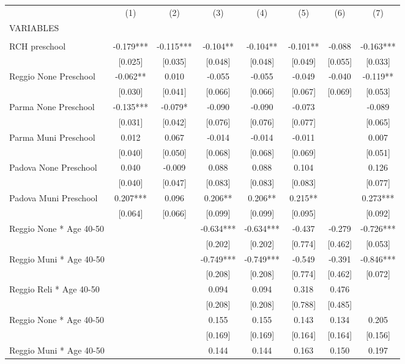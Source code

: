 \begin{tabular}{lccccccc} \hline
 & (1) & (2) & (3) & (4) & (5) & (6) & (7) \\
VARIABLES &  &  &  &  &  &  &  \\ \hline
 &  &  &  &  &  &  &  \\
RCH preschool & -0.179*** & -0.115*** & -0.104** & -0.104** & -0.101** & -0.088 & -0.163*** \\
 & [0.025] & [0.035] & [0.048] & [0.048] & [0.049] & [0.055] & [0.033] \\
Reggio None Preschool & -0.062** & 0.010 & -0.055 & -0.055 & -0.049 & -0.040 & -0.119** \\
 & [0.030] & [0.041] & [0.066] & [0.066] & [0.067] & [0.069] & [0.053] \\
Parma None Preschool & -0.135*** & -0.079* & -0.090 & -0.090 & -0.073 &  & -0.089 \\
 & [0.031] & [0.042] & [0.076] & [0.076] & [0.077] &  & [0.065] \\
Parma Muni Preschool & 0.012 & 0.067 & -0.014 & -0.014 & -0.011 &  & 0.007 \\
 & [0.040] & [0.050] & [0.068] & [0.068] & [0.069] &  & [0.051] \\
Padova None Preschool & 0.040 & -0.009 & 0.088 & 0.088 & 0.104 &  & 0.126 \\
 & [0.040] & [0.047] & [0.083] & [0.083] & [0.083] &  & [0.077] \\
Padova Muni Preschool & 0.207*** & 0.096 & 0.206** & 0.206** & 0.215** &  & 0.273*** \\
 & [0.064] & [0.066] & [0.099] & [0.099] & [0.095] &  & [0.092] \\
Reggio None * Age 40-50 &  &  & -0.634*** & -0.634*** & -0.437 & -0.279 & -0.726*** \\
 &  &  & [0.202] & [0.202] & [0.774] & [0.462] & [0.053] \\
Reggio Muni * Age 40-50 &  &  & -0.749*** & -0.749*** & -0.549 & -0.391 & -0.846*** \\
 &  &  & [0.208] & [0.208] & [0.774] & [0.462] & [0.072] \\
Reggio Reli * Age 40-50 &  &  & 0.094 & 0.094 & 0.318 & 0.476 &  \\
 &  &  & [0.208] & [0.208] & [0.788] & [0.485] &  \\
Reggio None * Age 40-50 &  &  & 0.155 & 0.155 & 0.143 & 0.134 & 0.205 \\
 &  &  & [0.169] & [0.169] & [0.164] & [0.164] & [0.156] \\
Reggio Muni * Age 40-50 &  &  & 0.144 & 0.144 & 0.163 & 0.150 & 0.197 \\

\end{tabular}
